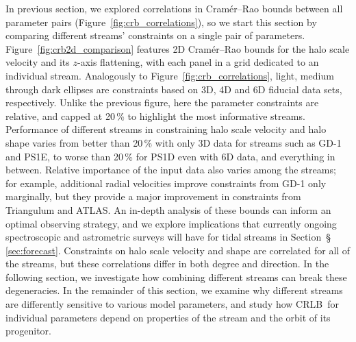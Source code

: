 \documentclass[modern]{aastex62}
\newcommand{\acronym}[1]{{\small{#1}}}
\newcommand{\CRLB}{\acronym{CRLB}}
\begin{document}
In previous section, we explored correlations in Cram\' er--Rao bounds between all parameter pairs (Figure~\ref{fig:crb_correlations}), so we start this section by comparing different streams' constraints on a single pair of parameters.
Figure~\ref{fig:crb2d_comparison} features 2D Cram\' er--Rao bounds for the halo scale velocity and its $z$-axis flattening, with each panel in a grid dedicated to an individual stream.
Analogously to Figure~\ref{fig:crb_correlations}, light, medium through dark ellipses are constraints based on 3D, 4D and 6D fiducial data sets, respectively.
Unlike the previous figure, here the parameter constraints are relative, and capped at 20\,\% to highlight the most informative streams.
Performance of different streams in constraining halo scale velocity and halo shape varies from better than 20\,\% with only 3D data for streams such as GD-1 and PS1E, to worse than 20\,\% for PS1D even with 6D data, and everything in between.
Relative importance of the input data also varies among the streams; for example, additional radial velocities improve constraints from GD-1 only marginally, but they provide a major improvement in constraints from Triangulum and ATLAS.
An in-depth analysis of these bounds can inform an optimal observing strategy, and we explore implications that currently ongoing spectroscopic and astrometric surveys will have for tidal streams in Section~\S\,\ref{sec:forecast}.
Constraints on halo scale velocity and shape are correlated for all of the streams, but these correlations differ in both degree and direction.
In the following section, we investigate how combining different streams can break these degeneracies.
In the remainder of this section, we examine why different streams are differently sensitive to various model parameters, and study how \CRLB\ for individual parameters depend on properties of the stream and the orbit of its progenitor.
\end{document}
